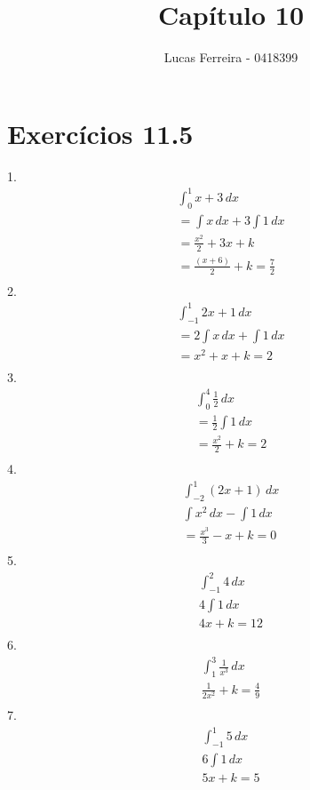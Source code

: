 \documentclass{article}
\title{Capítulo 10}
\author{Lucas Ferreira - 0418399}
\date{}
\begin{document}
\maketitle

\section{Exercícios 11.5}
1.
\begin{gather*}
    \int_{0}^{1} x+3\, dx
\\
    =\int x \,dx + 3\int 1\,dx
\\
    =\frac{x^2}{2} + 3x + k
\\
    =\frac{(x + 6)}{2} + k = \frac{7}{2}
\\
\end{gather*}
2.
\begin{gather*}
    \int_{-1}^{1} 2x+1\, dx
\\
    = 2\int x \,dx + \int 1\,dx
\\
    = x^2 + x + k = 2
\\
\end{gather*}
3.
\begin{gather*}
    \int_{0}^{4} \frac{1}{2}\, dx
\\
    =\frac{1}{2}\int 1\,dx
\\
    =\frac{x^2}{2} + k = 2
\\
\end{gather*}
4.
\begin{gather*}
    \int_{-2}^{1} (2x+1)\, dx
\\
    \int x^2\,dx - \int 1\,dx
\\
    =\frac{x^3}{3} -x + k = 0
\\
\end{gather*}
5.
\begin{gather*}
    \int_{-1}^{2} 4\, dx
\\
    4 \int 1\,dx
\\
    4x + k = 12
\\
\end{gather*}
6.
\begin{gather*}
    \int_{1}^{3} \frac{1}{x^3}\, dx
\\
    \frac{1}{2x^2} + k = \frac{4}{9}
\\
\end{gather*}
7.
\begin{gather*}
    \int_{-1}^{1} 5\, dx
\\
    6\int 1\,dx
\\
    5x + k =5
\\
\end{gather*}
\end{document}
